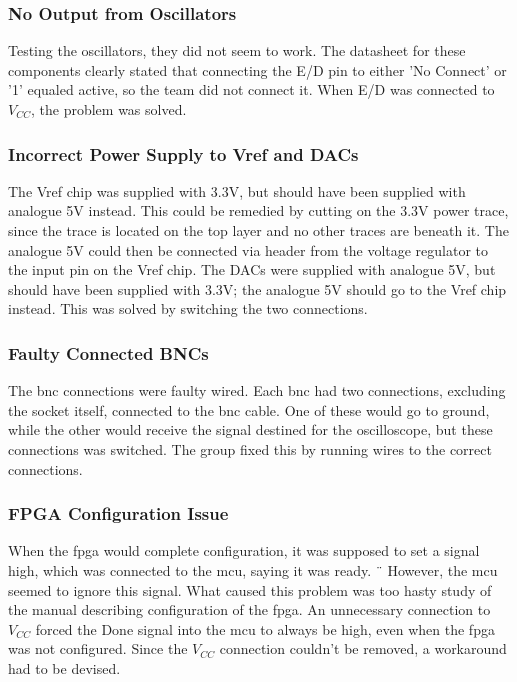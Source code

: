 \subsubsection{No Output from Oscillators}
Testing the oscillators, they did not seem to work. 
The datasheet for these components clearly stated that connecting the E/D pin to either 'No Connect' or '1' equaled active, so the team did not connect it. 
When E/D was connected to \(V_{CC}\), the problem was solved.

\subsubsection{Incorrect Power Supply to Vref and DACs}
The Vref chip was supplied with 3.3V, but should have been supplied with analogue 5V instead. 
This could be remedied by cutting on the 3.3V power trace, since the trace is located on the top layer and no other traces are beneath it. 
The analogue 5V could then be connected via header from the voltage regulator to the input pin on the Vref chip.
\newline
The DACs were supplied with analogue 5V, but should have been supplied with 3.3V; the analogue 5V should go to the Vref chip instead. 
This was solved by switching the two connections.

\subsubsection{Faulty Connected BNCs}
The \gls{bnc} connections were faulty wired. 
Each \gls{bnc} had two connections, excluding the socket itself, connected to the \gls{bnc} cable. 
One of these would go to ground, while the other would receive the signal destined for the oscilloscope, but these connections was switched. 
The group fixed this by running wires to the correct connections.

\subsubsection{FPGA Configuration Issue}
When the \gls{fpga} would complete configuration, it was supposed to set a signal high, which was connected to the \gls{mcu}, saying it was ready. ¨
However, the \gls{mcu} seemed to ignore this signal. 
What caused this problem was too hasty study of the manual describing configuration of the \gls{fpga}.
An unnecessary connection to \(V_{CC}\) forced the Done signal into the \gls{mcu} to always be high, even when the \gls{fpga} was not configured. 
Since the \(V_{CC}\) connection couldn't be removed, a workaround had to be devised.

